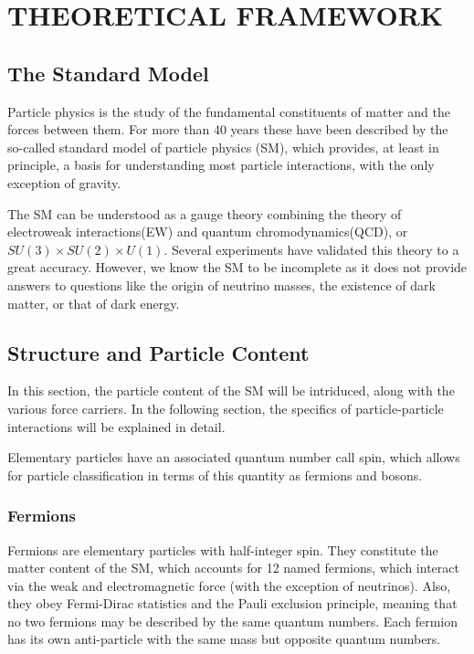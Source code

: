 %
%
%
%



\chapter{THEORETICAL FRAMEWORK}
\section{The Standard Model}
Particle physics is the study of the fundamental constituents of matter and the forces between them. For more than 40 years these have been described by the so-called standard model of particle physics (SM), which provides, at least in principle, a basis for understanding most particle interactions, with the only exception of gravity.

The SM can be understood as a gauge theory combining the theory of electroweak interactions(EW) and quantum chromodynamics(QCD), or $SU(3)\times SU(2) \times U(1)$. Several experiments have validated this theory to a great accuracy. However, we know the SM to be incomplete as it does not provide answers to questions like the origin of neutrino masses, the existence of dark matter, or that of dark energy.

\section{Structure and Particle Content}
In this section, the particle content of the SM will be intriduced, along with the various force carriers. In the following section, the specifics of particle-particle interactions will be explained in detail.

Elementary particles have an associated quantum number call spin, which allows for particle classification in terms of this quantity as fermions and bosons.

\subsection{Fermions}
Fermions are elementary particles with half-integer spin. They constitute the matter content of the SM, which accounts for 12 named fermions, which interact via the weak and electromagnetic force (with the exception of neutrinos). Also, they obey Fermi-Dirac statistics and the Pauli exclusion principle, meaning that no two fermions may be described by the same quantum numbers. Each fermion has its own anti-particle with the same mass but opposite quantum numbers.


